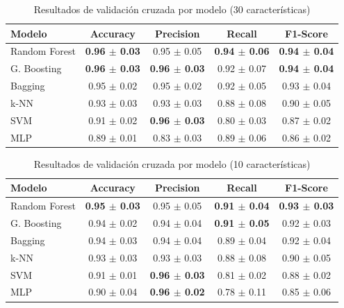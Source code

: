 \documentclass[a4paper,12pt]{article}
\begin{document}
\begin{table}[h!]
    \small
    \centering
    \begin{tabular}{lcccc}
        \hline
        Modelo        & Accuracy                 & Precision                & Recall                   & F1-Score                 \\
        \hline
        Random Forest & \textbf{0.96 $\pm$ 0.03} & 0.95 $\pm$ 0.05          & \textbf{0.94 $\pm$ 0.06} & \textbf{0.94 $\pm$ 0.04} \\
        G. Boosting   & \textbf{0.96 $\pm$ 0.03} & \textbf{0.96 $\pm$ 0.03} & 0.92 $\pm$ 0.07          & \textbf{0.94 $\pm$ 0.04} \\
        Bagging       & 0.95 $\pm$ 0.02          & 0.95 $\pm$ 0.02          & 0.92 $\pm$ 0.05          & 0.93 $\pm$ 0.04          \\
        k-NN          & 0.93 $\pm$ 0.03          & 0.93 $\pm$ 0.03          & 0.88 $\pm$ 0.08          & 0.90 $\pm$ 0.05          \\
        SVM           & 0.91 $\pm$ 0.02          & \textbf{0.96 $\pm$ 0.03} & 0.80 $\pm$ 0.03          & 0.87 $\pm$ 0.02          \\
        MLP           & 0.89 $\pm$ 0.01          & 0.83 $\pm$ 0.03          & 0.89 $\pm$ 0.06          & 0.86 $\pm$ 0.02          \\
        \hline
    \end{tabular}
    \caption{Resultados de validación cruzada por modelo (30 características)}
    \label{tab:resultados_cv_30}
\end{table}

\begin{table}[h!]
    \small
    \centering
    \begin{tabular}{lcccc}
        \hline
        Modelo        & Accuracy                 & Precision                & Recall                   & F1-Score                 \\
        \hline
        Random Forest & \textbf{0.95 $\pm$ 0.03} & 0.95 $\pm$ 0.05          & \textbf{0.91 $\pm$ 0.04} & \textbf{0.93 $\pm$ 0.03} \\
        G. Boosting   & 0.94 $\pm$ 0.02          & 0.94 $\pm$ 0.04          & \textbf{0.91 $\pm$ 0.05} & 0.92 $\pm$ 0.03          \\
        Bagging       & 0.94 $\pm$ 0.03          & 0.94 $\pm$ 0.04          & 0.89 $\pm$ 0.04          & 0.92 $\pm$ 0.04          \\
        k-NN          & 0.93 $\pm$ 0.03          & 0.93 $\pm$ 0.03          & 0.88 $\pm$ 0.08          & 0.90 $\pm$ 0.05          \\
        SVM           & 0.91 $\pm$ 0.01          & \textbf{0.96 $\pm$ 0.03} & 0.81 $\pm$ 0.02          & 0.88 $\pm$ 0.02          \\
        MLP           & 0.90 $\pm$ 0.04          & \textbf{0.96 $\pm$ 0.02} & 0.78 $\pm$ 0.11          & 0.85 $\pm$ 0.06          \\
        \hline
    \end{tabular}
    \caption{Resultados de validación cruzada por modelo (10 características)}
    \label{tab:resultados_cv_10}
\end{table}
\end{document}
